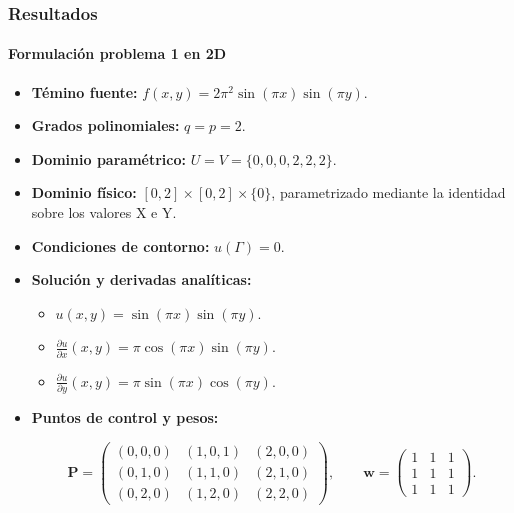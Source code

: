 \documentclass[compress]{beamer}
\begin{document}
\begin{frame}
	\frametitle{Resultados}
	\framesubtitle{Formulación problema 1 en 2D}

		\begin{itemize}
		\item{\textbf{Témino fuente:}} $f(x,y)=2\pi^2\sin(\pi x)\sin(\pi y)$. 
		\item \textbf{Grados polinomiales:} $q=p=2$.
		\item \textbf{Dominio paramétrico:} $U=V=\{0,0,0,2,2,2\}$.
		\item \textbf{Dominio físico:} $[0,2]\times[0,2]\times\{0\}$, parametrizado mediante la identidad sobre los valores X e Y.
		\item \textbf{Condiciones de contorno:} $u(\Gamma)=0$.
		\item \textbf{Solución y derivadas analíticas:}
		\begin{itemize}
			\item $u(x,y)=\sin(\pi x)\sin(\pi y)$.
			\item $\frac{\partial u}{\partial x}(x,y)=\pi \cos(\pi x)\sin(\pi y)$.
			\item $\frac{\partial u}{\partial y}(x,y)=\pi \sin(\pi x)\cos(\pi y)$.
		\end{itemize}
		\item \textbf{Puntos de control y pesos:}
		
		\vspace{-5pt}
		{\scriptsize
			\begin{equation*}
				\mathbf{P} = 
				\begin{pmatrix}
					(0, 0, 0) & (1, 0, 1) & (2, 0, 0) \\
					(0, 1, 0) & (1, 1, 0) & (2, 1, 0) \\
					(0, 2, 0) & (1, 2, 0) & (2, 2, 0)
				\end{pmatrix}
				,\qquad
				\mathbf{w}=
				\begin{pmatrix}
					1 & 1 & 1 \\
					1 & 1 & 1 \\
					1 & 1 & 1
				\end{pmatrix}
				.
			\end{equation*}
		}
	\end{itemize}
\end{frame}
\end{document}
